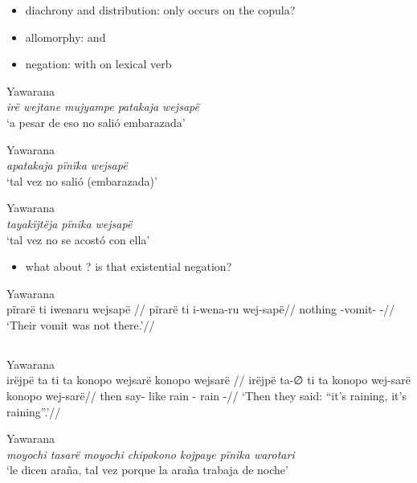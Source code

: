 \documentclass{memoir}
\begin{document}
\begin{itemize}
\tightlist
\item
  diachrony and distribution: only occurs on the copula?
\item
  allomorphy:  and 
\item
  negation: with  on lexical verb
\end{itemize}

\ex Yawarana \\
\label{ctoaragrme-38}    \textit{irë wejtane mujyampe patakaja wejsapë }\\
        ‘a pesar de eso no salió embarazada’ \xe

\ex Yawarana \\
\label{ctoaragrme-39}    \textit{apatakaja pïnïka wejsapë }\\
        ‘tal vez no salió (embarazada)’ \xe

\ex Yawarana \\
\label{ctoaragrme-40}    \textit{tayakïjtëja pïnika wejsapë }\\
        ‘tal vez no se acostó con ella’ \xe

\begin{itemize}
\tightlist
\item
  what about ? is that existential negation?
\end{itemize}

\ex Yawarana \\
\label{ctorat-19}    \begingl
    \glpreamble  pïrarë ti iwenaru wejsapë //
    \gla pïrarë ti i-wena-ru wej-sapë//
    \glb nothing  -vomit- -//
        \glft ‘Their vomit was not there.’//  
    \endgl 
\xe

\subsection{\texorpdfstring{}{}}

\ex Yawarana \\
\label{ctorat-25}    \begingl
    \glpreamble  irëjpë ta ti ta konopo wejsarë konopo wejsarë //
    \gla irëjpë ta-∅ ti ta konopo wej-sarë konopo wej-sarë//
    \glb then say-  like rain - rain -//
        \glft ‘Then they said: “it’s raining, it’s raining”.’//  
    \endgl 
\xe

\ex Yawarana \\
\label{ctoaragrme-25}    \textit{moyochi tasarë moyochi chipokono kojpaye pïnika warotari }\\
        ‘le dicen araña, tal vez porque la araña trabaja de noche’ \xe
\end{document}
